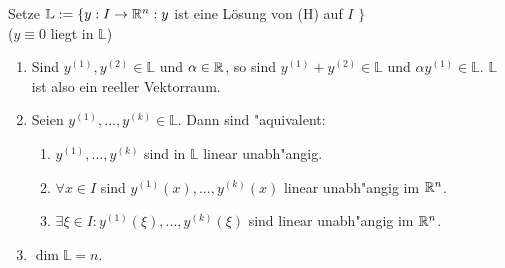 \documentclass[a4paper,twoside,DIV15,BCOR12mm,chapterprefix=true,headings=twolinechapter]{scrbook}
\begin{document}
\begin{definition}
Setze $\mathbb{L} := \{ y: I\to \mathbb{R}^n : y $ ist eine Lösung von (H) auf $I$ $\}$\\
($y \equiv 0$ liegt in $\mathbb{L}$)
\end{definition}

\begin{satz}
\begin{enumerate}
\item Sind $y^{(1)}, y^{(2)} \in \mathbb{L}$ und $\alpha \in \mathbb{R}$, so  
sind $y^{(1)} + y^{(2)} \in \mathbb{L}$ und $\alpha y^{(1)} \in \mathbb 
{L}$. $\mathbb{L}$ ist also ein reeller Vektorraum.

\item Seien $y^{(1)}, ..., y^{(k)} \in \mathbb{L}$. Dann sind  
"aquivalent:
 \begin{enumerate}
  \item $y^{(1)}, ... , y^{(k)}$ sind in $\mathbb{L}$ linear unabh"angig.
  \item $\forall x \in I$ sind $y^{(1)}(x), ..., y^{(k)}(x)$ linear  
unabh"angig im $\mathbb{R}^n$.
  \item $\exists \xi \in I: y^{(1)}(\xi ), ..., y^{(k)}(\xi ) 
$ sind linear unabh"angig im $\mathbb{R}^n$.
 \end{enumerate}

\item $\dim \mathbb{L} = n$.
\end{enumerate}
\end{satz}
\end{document}
